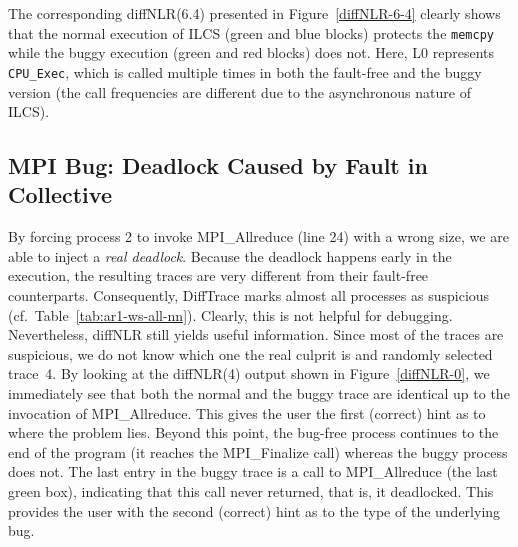 The corresponding diffNLR(6.4) presented in Figure~\ref{diffNLR-6-4} clearly shows that the normal execution of ILCS (green and blue blocks) protects the \texttt{memcpy} while the buggy execution (green and red blocks) does not. Here, L0 represents \texttt{CPU\_Exec}, which is called multiple times in both the fault-free and the buggy version (the call frequencies are different due to the asynchronous nature of ILCS).
%





\subsection{MPI Bug: Deadlock Caused by Fault in Collective}

By forcing process 2 to invoke MPI\_Allreduce (line 24) with a wrong size, we are able to inject a \textit{real deadlock}.
%
Because the deadlock happens early in the execution, the resulting traces are very different from their fault-free counterparts.
%
Consequently, DiffTrace marks almost all processes as suspicious (cf.~Table~\ref{tab:ar1-ws-all-nn}).
%
Clearly, this is not helpful for debugging.
%
Nevertheless, diffNLR still yields useful information.
%
Since most of the traces are suspicious, we do not know which one the real culprit is and randomly selected trace~4.
%
%
By looking at the diffNLR(4) output shown in Figure~\ref{diffNLR-0}, we immediately see that both the normal and the buggy trace are identical up to the invocation of MPI\_Allreduce. This gives the user the first (correct) hint as to where the problem lies.
%
Beyond this point, the bug-free process continues to the end of the program 
(it reaches the MPI\_Finalize call) whereas the buggy process does not. The last entry in the buggy trace is a call to MPI\_Allreduce (the last green box), indicating that this call never returned, that is, it deadlocked. This provides the user with the second (correct) hint as to the type of the underlying bug.
%

%

%

